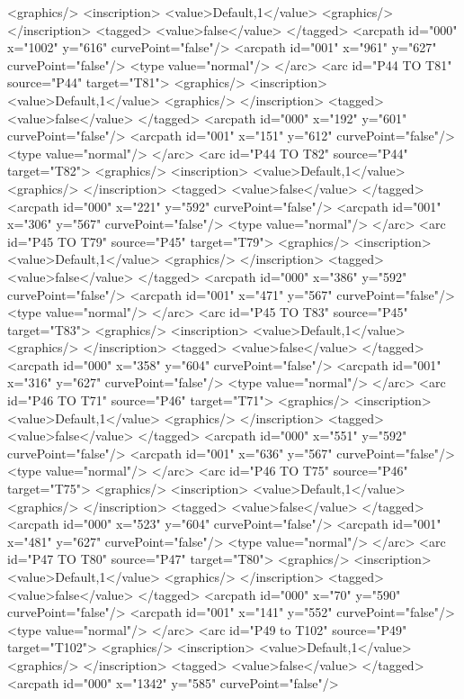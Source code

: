 <graphics/>
<inscription>
<value>Default,1</value>
<graphics/>
</inscription>
<tagged>
<value>false</value>
</tagged>
<arcpath id="000" x="1002" y="616" curvePoint="false"/>
<arcpath id="001" x="961" y="627" curvePoint="false"/>
<type value="normal"/>
</arc>
<arc id="P44 TO T81" source="P44" target="T81">
<graphics/>
<inscription>
<value>Default,1</value>
<graphics/>
</inscription>
<tagged>
<value>false</value>
</tagged>
<arcpath id="000" x="192" y="601" curvePoint="false"/>
<arcpath id="001" x="151" y="612" curvePoint="false"/>
<type value="normal"/>
</arc>
<arc id="P44 TO T82" source="P44" target="T82">
<graphics/>
<inscription>
<value>Default,1</value>
<graphics/>
</inscription>
<tagged>
<value>false</value>
</tagged>
<arcpath id="000" x="221" y="592" curvePoint="false"/>
<arcpath id="001" x="306" y="567" curvePoint="false"/>
<type value="normal"/>
</arc>
<arc id="P45 TO T79" source="P45" target="T79">
<graphics/>
<inscription>
<value>Default,1</value>
<graphics/>
</inscription>
<tagged>
<value>false</value>
</tagged>
<arcpath id="000" x="386" y="592" curvePoint="false"/>
<arcpath id="001" x="471" y="567" curvePoint="false"/>
<type value="normal"/>
</arc>
<arc id="P45 TO T83" source="P45" target="T83">
<graphics/>
<inscription>
<value>Default,1</value>
<graphics/>
</inscription>
<tagged>
<value>false</value>
</tagged>
<arcpath id="000" x="358" y="604" curvePoint="false"/>
<arcpath id="001" x="316" y="627" curvePoint="false"/>
<type value="normal"/>
</arc>
<arc id="P46 TO T71" source="P46" target="T71">
<graphics/>
<inscription>
<value>Default,1</value>
<graphics/>
</inscription>
<tagged>
<value>false</value>
</tagged>
<arcpath id="000" x="551" y="592" curvePoint="false"/>
<arcpath id="001" x="636" y="567" curvePoint="false"/>
<type value="normal"/>
</arc>
<arc id="P46 TO T75" source="P46" target="T75">
<graphics/>
<inscription>
<value>Default,1</value>
<graphics/>
</inscription>
<tagged>
<value>false</value>
</tagged>
<arcpath id="000" x="523" y="604" curvePoint="false"/>
<arcpath id="001" x="481" y="627" curvePoint="false"/>
<type value="normal"/>
</arc>
<arc id="P47 TO T80" source="P47" target="T80">
<graphics/>
<inscription>
<value>Default,1</value>
<graphics/>
</inscription>
<tagged>
<value>false</value>
</tagged>
<arcpath id="000" x="70" y="590" curvePoint="false"/>
<arcpath id="001" x="141" y="552" curvePoint="false"/>
<type value="normal"/>
</arc>
<arc id="P49 to T102" source="P49" target="T102">
<graphics/>
<inscription>
<value>Default,1</value>
<graphics/>
</inscription>
<tagged>
<value>false</value>
</tagged>
<arcpath id="000" x="1342" y="585" curvePoint="false"/>

